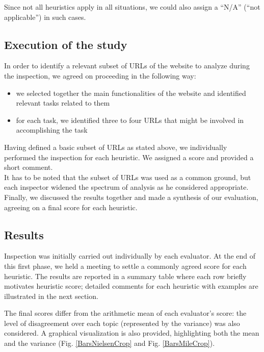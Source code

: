 Since not all heuristics apply in all situations, we could also assign a ``N/A'' (``not applicable'') in such cases.

\subsection{Execution of the study}
In order to identify a relevant subset of URLs of the website to analyze during the inspection, we agreed on proceeding in the following way:
\begin{itemize}
    \item we selected together the main functionalities of the website and identified relevant tasks related to them
    \item for each task, we identified three to four URLs that might be involved in accomplishing the task    
\end{itemize}
Having defined a basic subset of URLs as stated above, we individually performed the inspection for each heuristic. We assigned a score and provided a short comment. \\
It has to be noted that the subset of URLs was used as a common ground, but each inspector widened the spectrum of analysis as he considered appropriate.\\
Finally, we discussed the results together and made a synthesis of our evaluation, agreeing on a final score for each heuristic.   


\pagebreak

\subsection{Results}
Inspection was initially carried out individually by each evaluator. At the end of this first phase, we held a meeting to settle a commonly agreed score for each heuristic.
The results are reported in a summary table where each row briefly motivates heuristic score; detailed comments for each heuristic with examples are illustrated in the next section.

The final scores differ from the arithmetic mean of each evaluator's score: the level of disagreement over each topic (represented by the variance) was also considered. A graphical visualization is also provided, highlighting both the mean and the variance (Fig. \ref{BarsNielsenCrop} and Fig. \ref{BarsMileCrop}).


